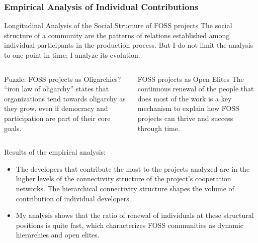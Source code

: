 \documentclass[ignorenonframetext,red,8pt,notes=show]{beamer}
\begin{document}
\begin{frame}
\frametitle{Empirical Analysis of Individual Contributions}


\begin{block}{Longitudinal Analysis of the Social Structure of FOSS projects}
The social structure of a community are the patterns of relations established among individual participants in the production process. But I do not limit the analysis to one point in time; I analyze its evolution.
\end{block}

\begin{columns}[c]
\begin{column}{0.5\textwidth}
\begin{block}{Puzzle: FOSS projects as Oligarchies?}
\citet{michels:1915} ``iron law of oligarchy'' states that organizations tend towards oligarchy as they grow, even if democracy and participation are part of their core goals.
\end{block}
\end{column}

\begin{column}{0.5\textwidth}
\begin{block}{FOSS projects as Open Elites}
The continuous renewal of the people that does most of the work is a key mechanism to explain how FOSS projects can thrive and success through time.
\end{block}
\end{column}
\end{columns}

\vspace{0.2cm}

Results of the empirical analysis:

\begin{itemize}
\item The developers that contribute the most to the projects analyzed are in the higher levels of the connectivity structure of the project's cooperation networks. The hierarchical connectivity structure shapes the volume of contribution of individual developers.

\item My analysis shows that the ratio of renewal of individuals at these structural positions is quite fast, which characterizes FOSS communities as dynamic hierarchies and open
elites.


\end{itemize}
\end{frame}
\end{document}
